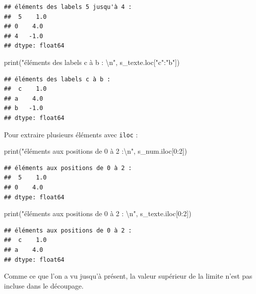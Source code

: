 \documentclass[
  12pt,
]{book}
\newenvironment{Shaded}{\begin{snugshade}}{\end{snugshade}}
\newcommand{\BuiltInTok}[1]{#1}
\newcommand{\CharTok}[1]{\textcolor[rgb]{0.31,0.60,0.02}{#1}}
\newcommand{\DecValTok}[1]{\textcolor[rgb]{0.00,0.00,0.81}{#1}}
\newcommand{\NormalTok}[1]{#1}
\newcommand{\StringTok}[1]{\textcolor[rgb]{0.31,0.60,0.02}{#1}}
\numberwithin{equation}{section}
\numberwithin{countremarque}{section}
\begin{document}
\begin{lstlisting}
## éléments des labels 5 jusqu'à 4 :
##  5    1.0
## 0    4.0
## 4   -1.0
## dtype: float64
\end{lstlisting}

\begin{Shaded}
\begin{Highlighting}[]
\BuiltInTok{print}\NormalTok{(}\StringTok{"éléments des labels c à b : }\CharTok{\textbackslash{}n}\StringTok{"}\NormalTok{, s\_texte.loc[}\StringTok{"c"}\NormalTok{:}\StringTok{"b"}\NormalTok{])}
\end{Highlighting}
\end{Shaded}

\begin{lstlisting}
## éléments des labels c à b : 
##  c    1.0
## a    4.0
## b   -1.0
## dtype: float64
\end{lstlisting}

Pour extraire plusieurs éléments avec \texttt{iloc} :

\begin{Shaded}
\begin{Highlighting}[]
\BuiltInTok{print}\NormalTok{(}\StringTok{"éléments aux positions de 0 à 2 :}\CharTok{\textbackslash{}n}\StringTok{"}\NormalTok{, s\_num.iloc[}\DecValTok{0}\NormalTok{:}\DecValTok{2}\NormalTok{])}
\end{Highlighting}
\end{Shaded}

\begin{lstlisting}
## éléments aux positions de 0 à 2 :
##  5    1.0
## 0    4.0
## dtype: float64
\end{lstlisting}

\begin{Shaded}
\begin{Highlighting}[]
\BuiltInTok{print}\NormalTok{(}\StringTok{"éléments aux positions de 0 à 2 : }\CharTok{\textbackslash{}n}\StringTok{"}\NormalTok{, s\_texte.iloc[}\DecValTok{0}\NormalTok{:}\DecValTok{2}\NormalTok{])}
\end{Highlighting}
\end{Shaded}

\begin{lstlisting}
## éléments aux positions de 0 à 2 : 
##  c    1.0
## a    4.0
## dtype: float64
\end{lstlisting}

Comme ce que l'on a vu jusqu'à présent, la valeur supérieur de la limite n'est pas incluse dans le découpage.
\end{document}
